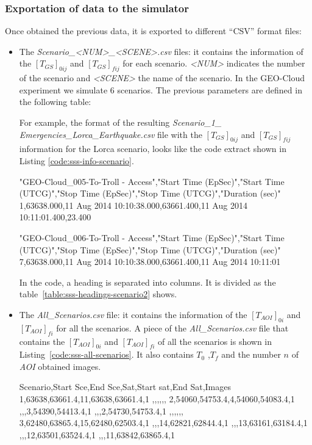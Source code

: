 \subsubsection{Exportation of data to the simulator}

Once obtained the previous data, it is exported to different ``CSV'' format files:

\begin{itemize}
\item 	The \emph{Scenario\_<NUM>\_<SCENE>.csv} files: it contains the information
  of the $[T_{GS}]_{0ij}$ and $[T_{GS}]_{fij}$ for each scenario. \emph{<NUM>} indicates
  the number of the scenario and \emph{<SCENE>} the name of the scenario. In the
  GEO-Cloud experiment we simulate 6 scenarios. The previous parameters are
  defined in the following table:


For example, the format of the resulting \emph{Scenario\_1\_
Emergencies\_Lorca\_Earthquake.csv} file with the $[T_{GS}]_{0ij}$ and $[T_{GS}]_{fij}$
information for the Lorca scenario, looks like the code extract shown in Listing
\ref{code:sss-info-scenario}.
\begin{listing}[
  float=h!,
  caption  = {Extract of the \emph{Scenario\_1\_Emergencies\_Lorca\_Earthquake.csv}
    of the Lorca scenario},
  label    = code:sss-info-scenario,
style=customc]
"GEO-Cloud_005-To-Troll - Access","Start Time (EpSec)","Start Time (UTCG)","Stop Time (EpSec)","Stop Time (UTCG)","Duration (sec)"
1,63638.000,11 Aug 2014 10:10:38.000,63661.400,11 Aug 2014 10:11:01.400,23.400

"GEO-Cloud_006-To-Troll - Access","Start Time (EpSec)","Start Time (UTCG)","Stop Time (EpSec)","Stop Time (UTCG)","Duration (sec)"
7,63638.000,11 Aug 2014 10:10:38.000,63661.400,11 Aug 2014 10:11:01

\end{listing}
In the code, a heading is separated into columns. It is divided as the
table~\ref{table:sss-headings-scenario2} shows.

\item 	The \emph{All\_Scenarios.csv} file: it contains the information of the $[T_{AOI}]_{0i}$ and $[T_{AOI}]_{fi}$ for all the scenarios.
A piece of the \emph{All\_Scenarios.csv} file that contains the $[T_{AOI}]_{0i}$
and $[T_{AOI}]_{fi}$ of all the scenarios is shown in Listing~\ref{code:sss-all-scenarios}.  It also contains  $T_0$ ,$T_f$ and the number $n$ of \emph{AOI} obtained images.


\begin{listing}[
  float=h!,
  caption  = {Extract of the \emph{All\_Scenarios.csv} code of the Lorca scenario},
  label    = code:sss-all-scenarios,
style=customc]
Scenario,Start Sce,End Sce,Sat,Start sat,End Sat,Images
1,63638,63661.4,11,63638,63661.4,1
,,,,,,
2,54060,54753.4,4,54060,54083.4,1
,,,3,54390,54413.4,1
,,,2,54730,54753.4,1
,,,,,,
3,62480,63865.4,15,62480,62503.4,1
,,,14,62821,62844.4,1
,,,13,63161,63184.4,1
,,,12,63501,63524.4,1
,,,11,63842,63865.4,1
\end{listing}


\end{itemize}
